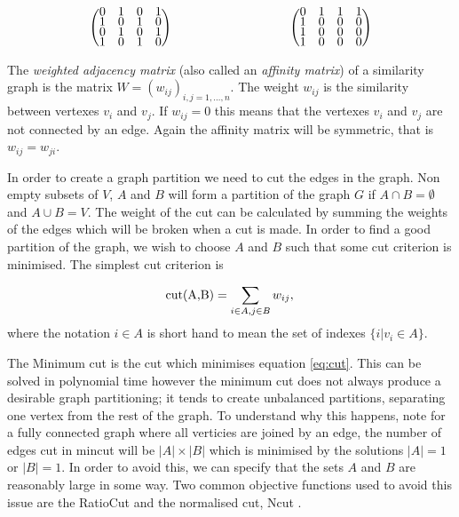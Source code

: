 \begin{equation}
\label{eq:adj_mat}
\renewcommand*{\arraystretch}{.5}
  \begin{pmatrix}
    0 & 1 & 0 & 1 \\
    1 & 0 & 1 & 0 \\
    0 & 1 & 0 & 1 \\
    1 & 0 & 1 & 0 
    \end{pmatrix}
\hspace{1.3in}
\renewcommand*{\arraystretch}{.5}
  \begin{pmatrix}
    0 & 1 & 1 & 1 \\
    1 & 0 & 0 & 0 \\
    1 & 0 & 0 & 0 \\
    1 & 0 & 0 & 0 
    \end{pmatrix}
\end{equation}

The \textit{weighted adjacency matrix} (also called an \textit{affinity matrix}) of a similarity graph is the matrix $W = (w_{ij})_{i,j = 1,\ldots, n}$. The weight $w_{ij}$ is the similarity between vertexes $v_i$ and $v_j$.  If $w_{ij}=0$ this means that the vertexes $v_i$ and $v_j$ are not connected by an edge. Again the affinity matrix will be symmetric, that is $w_{ij} = w_{ji}$. 

In order to create a graph partition we need to cut the edges in the graph. Non empty subsets of $V$, $A$ and $B$ will form a partition of the graph $G$ if $A \cap B = \emptyset  $ and $A \cup B = V$.  
The weight of the cut can be calculated by summing the weights of the edges which will be broken when a cut is made. In order to find a good partition of the graph, we wish to choose $A$ and $B$  such that some cut criterion is minimised.  The simplest cut criterion is

\begin{equation}
  \text{cut(A,B)} = \sum_{i \in A, j \in B} w_{ij},\\
  \label{eq:cut}
\end{equation}
where the notation $i \in A$ is short hand to mean the set of indexes $\{ i | v_i \in A \}$.

The Minimum cut \citep{Wu1993} is the cut which minimises equation \eqref{eq:cut}. This can be solved in polynomial time \citep{Stoer1997} however the  minimum cut does not always produce a desirable graph partitioning; it tends to create unbalanced partitions, separating one vertex from the rest of the graph. To understand why this happens, note for a fully connected graph where all verticies are joined by an edge, the number of edges cut in mincut will be  $|A| \times |B|$ which is minimised by the solutions $|A| = 1$ or $|B| = 1$. In order to avoid this, we can specify that the sets $A$ and $B$ are reasonably large in some way. Two common objective functions used to avoid this issue are the RatioCut \citep{Hagen1992} and the normalised cut, Ncut \citep{Malik2000}. 

